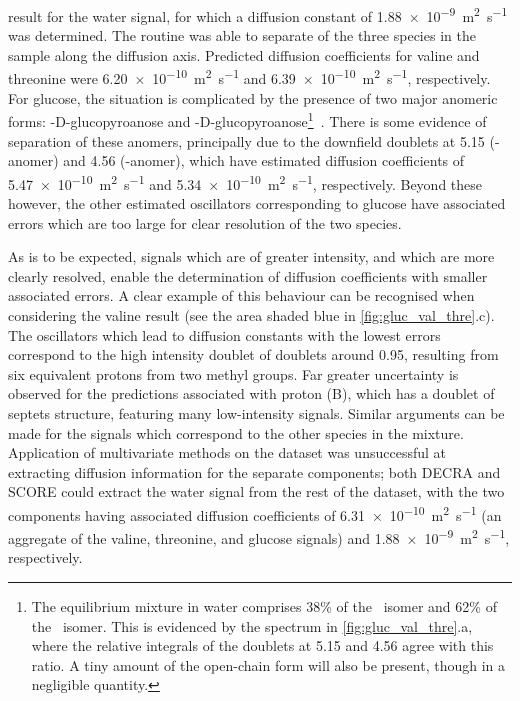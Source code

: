 result for the water signal, for which a diffusion constant of
\qty{1.88e-9}{\meter\squared\per\second} was determined. The routine
was able to separate of the three species in the sample along the diffusion
axis. Predicted diffusion coefficients for valine and threonine were
\qty{6.20e-10}{\meter\squared\per\second} and
\qty{6.39e-10}{\meter\squared\per\second}, respectively. For glucose, the situation is
complicated by the presence of two major anomeric forms:
\textalpha-D-glucopyroanose and
\textbeta-D-glucopyroanose\footnote{
    The equilibrium mixture in water comprises 38\% of the \textalpha\ isomer
    and 62\% of the \textbeta\ isomer.
    This is evidenced by the
    spectrum in \cref{fig:gluc_val_thre}.a, where the relative integrals of
    the doublets at \qty{5.15}{\partspermillion} and
    \qty{4.56}{\partspermillion} agree with this ratio.
    A tiny amount of the open-chain form will
    also be present, though in a negligible quantity.
}~\cite[Chapter 3]{Davis2002}.
There is some evidence of separation of these anomers, principally due
to the downfield doublets at \qty{5.15}{\partspermillion} (\textalpha-anomer) and
\qty{4.56}{\partspermillion} (\textbeta-anomer), which have estimated diffusion
coefficients of \qty{5.47e-10}{\meter\squared\per\second}
and \qty{5.34e-10}{\meter\squared\per\second}, respectively. Beyond these
however, the other estimated oscillators corresponding to glucose have
associated errors which are too large for clear resolution of the two species.
\label{corr:gluc-D}

As is to be expected, signals which are of greater intensity, and which are
more clearly resolved, enable the determination of diffusion coefficients with
smaller associated errors. A clear example of this behaviour can be recognised when
considering the valine result (see the area shaded blue in
\cref{fig:gluc_val_thre}.c). The
oscillators which lead to diffusion constants with the lowest errors correspond to
the high intensity doublet of doublets around \qty{0.95}{\partspermillion},
resulting from six equivalent protons from two methyl groups. Far
greater uncertainty is observed for the predictions associated with proton (B),
which has a doublet of septets structure, featuring many low-intensity signals.
Similar arguments can be made for the signals which correspond to the other
species in the mixture.
Application of multivariate methods on the dataset was unsuccessful at
extracting diffusion information for the separate components; both
\ac{DECRA} and \ac{SCORE} could extract the water
signal from the rest of the dataset, with the two components having associated
diffusion coefficients of \qty{6.31e-10}{\meter\squared\per\second} (an
aggregate of the valine, threonine, and glucose signals) and
\qty{1.88e-9}{\meter\squared\per\second}, respectively.
